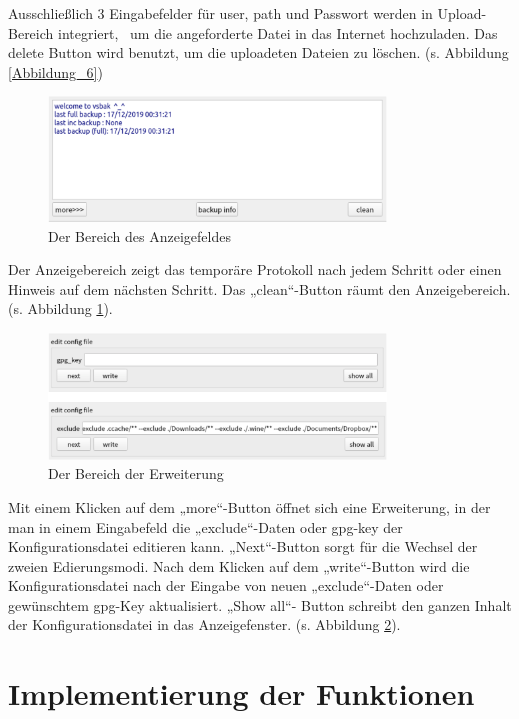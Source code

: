 Ausschließlich 3 Eingabefelder für user, path und Passwort werden in Upload-Bereich integriert,  um die angeforderte Datei in das Internet hochzuladen. Das delete Button wird benutzt, um die uploadeten Dateien zu löschen. (s. Abbildung \ref{Abbildung_6})

\begin{figure}[h!]
	\centering
	\includegraphics[width=0.8\textwidth]{bilder/backup_info.png}
	\caption{Der Bereich des Anzeigefeldes  }
	\label{Abbildung_7}
\end{figure}

Der Anzeigebereich zeigt das temporäre Protokoll nach jedem Schritt oder einen Hinweis auf dem nächsten Schritt. Das „clean“-Button räumt den Anzeigebereich. (s. Abbildung \ref{Abbildung_7}).

\begin{figure}[h!]
	\centering
	\includegraphics[width=0.8\textwidth]{bilder/more_func.png}
	\caption{Der Bereich der Erweiterung  }
	\label{Abbildung_8}
\end{figure}

Mit einem Klicken auf dem „more“-Button öffnet sich eine Erweiterung, in der man in einem Eingabefeld die „exclude“-Daten oder gpg-key der Konfigurationsdatei editieren kann. „Next“-Button sorgt für die Wechsel der zweien Edierungsmodi. Nach dem Klicken auf dem „write“-Button wird die Konfigurationsdatei nach der Eingabe von neuen „exclude“-Daten oder gewünschtem gpg-Key aktualisiert. „Show all“- Button schreibt den ganzen Inhalt der Konfigurationsdatei in das Anzeigefenster. (s. Abbildung \ref{Abbildung_8}). 

\section{Implementierung der Funktionen}

